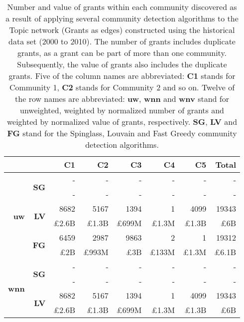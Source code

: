 \begin{table}[!htbp]
\centering
\caption[Number and value of grants within each community discovered in the Topic network (Grants as edges) constructed using the historical data set (2000 to 2010)]{Number and value of grants within each community discovered as a result of applying several community detection algorithms to the Topic network (Grants as edges) constructed using the historical data set (2000 to 2010). The number of grants includes duplicate grants, as a grant can be part of more than one community. Subsequently, the value of grants also includes the duplicate grants. Five of the column names are abbreviated: \textbf{C1} stands for Community 1, \textbf{C2} stands for Community 2 and so on. Twelve of the row names are abbreviated: \textbf{uw}, \textbf{wnn} and \textbf{wnv} stand for unweighted, weighted by normalized number of grants and weighted by normalized value of grants, respectively. \textbf{SG}, \textbf{LV} and \textbf{FG} stand for the Spinglass, Louvain and Fast Greedy community detection algorithms.}
\label{table:topic_a_past1_grants1_appendix}
\begin{tabular}{r|r|r|r|r|r|r|r}
\multicolumn{2}{c|}{} & \textbf{C1} & \textbf{C2} & \textbf{C3} & \textbf{C4} & \textbf{C5} & \textbf{Total}\\
\hline
\multirow{6}{*}{\textbf{uw}}
& \multirow{2}{*}{\textbf{SG}}
& {-} & {-} & {-} & {-} & {-} & {-}\\
& {} & {-} & {-} & {-} & {-} & {-} & {-}\\
\cline{2-8}
& \multirow{2}{*}{\textbf{LV}}
& {8682} & {5167} & {1394} & {1} & {4099} & {19343}\\
& {} & {\pounds2.6B} & {\pounds1.3B} & {\pounds699M} & {\pounds1.3M} & {\pounds1.3B} & {\pounds6B}\\
\cline{2-8}
& \multirow{2}{*}{\textbf{FG}}
& {6459} & {2987} & {9863} & {2} & {1} & {19312}\\
& {} & {\pounds2B} & {\pounds993M} & {\pounds3B} & {\pounds133M} & {\pounds1.3M} & {\pounds6.1B}\\
\hline
\multirow{6}{*}{\textbf{wnn}}
& \multirow{2}{*}{\textbf{SG}}
& {-} & {-} & {-} & {-} & {-} & {-}\\
& {} & {-} & {-} & {-} & {-} & {-} & {-}\\
\cline{2-8}
& \multirow{2}{*}{\textbf{LV}}
& {8682} & {5167} & {1394} & {1} & {4099} & {19343}\\
& {} & {\pounds2.6B} & {\pounds1.3B} & {\pounds699M} & {\pounds1.3M} & {\pounds1.3B} & {\pounds6B}\\

\end{tabular}
\end{table}
